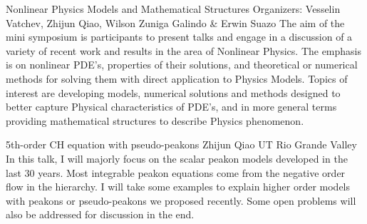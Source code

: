 \label{mini24}


\miniabs
{Nonlinear Physics Models and Mathematical Structures}
{Organizers: Vesselin Vatchev, Zhijun Qiao, Wilson Zuniga Galindo \& Erwin Suazo}
{The aim of the mini symposium is participants to present talks and engage in a discussion of a variety of recent work and results in the area of Nonlinear Physics. The emphasis is on nonlinear PDE’s, properties of their solutions, and theoretical or numerical methods for solving them with direct application to Physics Models. Topics of interest are developing models, numerical solutions and methods designed to better capture Physical characteristics of PDE’s, and in more general terms providing mathematical structures to describe Physics phenomenon.}

\begin{addmargin}[2em]{0em}
\vspace{2ex}

\abs
{5th-order CH equation with pseudo-peakons}
{Zhijun Qiao }
{UT Rio Grande Valley}
{In this talk, I will majorly focus on the scalar peakon models developed in the last 30 years. Most integrable peakon equations come from the negative order flow in the hierarchy. I will take some examples to explain higher order models with peakons or pseudo-peakons we proposed recently. Some open problems will also be addressed for discussion in the end.
}


\end{addmargin}
